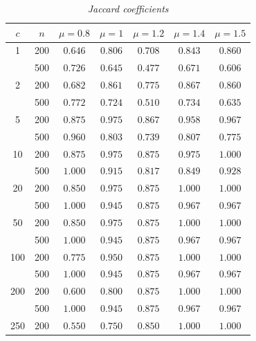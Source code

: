 \documentclass[11pt,onside,a4paper,fleqn]{report}
\renewcommand\arraystretch{2.5}
\begin{document}
\renewcommand\arraystretch{1.2} 
\begin{table}[!h]
    \begin{center}
    \caption{\small{\it{Jaccard coefficients}}}
    \label{table.p1}

    \begin{tabular}{|c | c | c | c | c | c | c | }
    \hline
    \(c\)    & \(n\)       & $\mu=0.8$  & $\mu=1$   & $\mu=1.2$ & $\mu=1.4$ & $\mu=1.5$\\ \hline
    1           & 200      &  $0.646$	&  $0.806$	&  $0.708$	&  $0.843$	&  $0.860$\\
                & 500      &  $0.726$	&  $0.645$	&  $0.477$	&  $0.671$	&  $0.606$\\ \hline
    2           & 200      &  $0.682$	&  $0.861$	&  $0.775$	&  $0.867$	&  $0.860$\\
                & 500      &  $0.772$	&  $0.724$	&  $0.510$	&  $0.734$	&  $0.635$\\ \hline
    5           & 200      &  $0.875$	&  $0.975$	&  $0.867$	&  $0.958$	&  $0.967$\\
                & 500      &  $0.960$	&  $0.803$	&  $0.739$	&  $0.807$	&  $0.775$\\ \hline
    10          & 200      &  $0.875$	&  $0.975$	&  $0.875$	&  $0.975$	&  $1.000$\\
                & 500      &  $1.000$	&  $0.915$	&  $0.817$	&  $0.849$	&  $0.928$\\ \hline
    20          & 200      &  $0.850$	&  $0.975$	&  $0.875$	&  $1.000$	&  $1.000$\\
                & 500      &  $1.000$	&  $0.945$	&  $0.875$	&  $0.967$	&  $0.967$\\ \hline
    50          & 200      &  $0.850$	&  $0.975$	&  $0.875$	&  $1.000$	&  $1.000$\\
                & 500      &  $1.000$	&  $0.945$	&  $0.875$	&  $0.967$	&  $0.967$\\ \hline
    100         & 200      &  $0.775$	&  $0.950$	&  $0.875$	&  $1.000$	&  $1.000$\\
                & 500      &  $1.000$	&  $0.945$	&  $0.875$	&  $0.967$	&  $0.967$\\ \hline
    200         & 200      &  $0.600$	&  $0.800$	&  $0.875$	&  $1.000$	&  $1.000$\\
                & 500      &  $1.000$	&  $0.945$	&  $0.875$	&  $0.967$	&  $0.967$\\ \hline
    250         & 200      &  $0.550$	&  $0.750$	&  $0.850$	&  $1.000$	&  $1.000$\\

\end{tabular}
\end{center}
\end{table}
\end{document}
